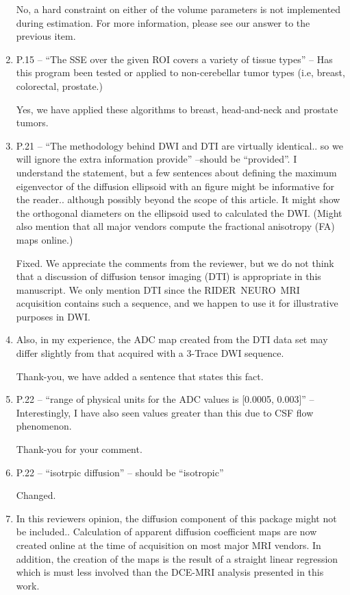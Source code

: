 \documentclass[11pt]{article}
\begin{document}
\begin{enumerate}
  No, a hard constraint on either of the volume parameters is not
  implemented during estimation.  For more information, please see our
  answer to the previous item.

\item P.15 – ``The SSE over the given ROI covers a variety of tissue
  types'' – Has this program been tested or applied to non-cerebellar
  tumor types (i.e, breast, colorectal, prostate.)

  Yes, we have applied these algorithms to breast, head-and-neck and
  prostate tumors.

\item P.21 – ``The methodology behind DWI and DTI are virtually
  identical.. so we will ignore the extra information provide''
  –should be ``provided''.  I understand the statement, but a few
  sentences about defining the maximum eigenvector of the diffusion
  ellipsoid with an figure might be informative for the
  reader.. although possibly beyond the scope of this article. It
  might show the orthogonal diameters on the ellipsoid used to
  calculated the DWI. (Might also mention that all major vendors
  compute the fractional anisotropy (FA) maps online.)

  Fixed.  We appreciate the comments from the reviewer, but we do not
  think that a discussion of diffusion tensor imaging (DTI) is
  appropriate in this manuscript.  We only mention DTI since the
  RIDER~NEURO~MRI acquisition contains such a sequence, and we happen
  to use it for illustrative purposes in DWI.

\item Also, in my experience, the ADC map created from the DTI data
  set may differ slightly from that acquired with a 3-Trace DWI
  sequence.

  Thank-you, we have added a sentence that states this fact.

\item P.22 – ``range of physical units for the ADC values is [0.0005,
  0.003]'' – Interestingly, I have also seen values greater than this
  due to CSF flow phenomenon.

  Thank-you for your comment.

\item P.22 – ``isotrpic diffusion'' – should be ``isotropic''

  Changed.

\item In this reviewers opinion, the diffusion component of this
  package might not be included..  Calculation of apparent diffusion
  coefficient maps are now created online at the time of acquisition
  on most major MRI vendors.  In addition, the creation of the maps is
  the result of a straight linear regression which is must less
  involved than the DCE-MRI analysis presented in this work.


\end{enumerate}
\end{document}
